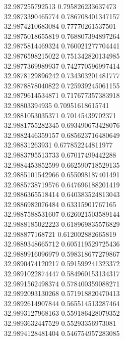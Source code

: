 {32.987255792513	0.795826233637473\\
32.9873390465774	0.786708401347157\\
32.9874210683084	0.77770261537501\\
32.9875018655819	0.768807394897264\\
32.9875814469324	0.760021277704441\\
32.9876598215022	0.751342820134985\\
32.9877369989937	0.742770596997414\\
32.9878129896242	0.734303201481777\\
32.9878878040822	0.725939245061155\\
32.9879614534871	0.717677357383918\\
32.98803394935	0.70951618615741\\
32.9881053035371	0.70145439702371\\
32.9881755282345	0.693490673428076\\
32.9882446359157	0.685623716480649\\
32.98831263931	0.677852244811977\\
32.9883795513733	0.67017499442288\\
32.9884453852599	0.662590718529135\\
32.9885101542966	0.655098187401491\\
32.9885738719576	0.647696188201419\\
32.9886365518414	0.640383524813043\\
32.9886982076484	0.63315901767165\\
32.9887588531607	0.626021503589144\\
32.9888185022223	0.618969835576829\\
32.988877168721	0.612002882665819\\
32.9889348665712	0.605119529725436\\
32.9889916096979	0.598318677279867\\
32.9890474120217	0.591599241323372\\
32.9891022874447	0.584960153134317\\
32.9891562498374	0.578400359088271\\
32.9892093130268	0.571918820470413\\
32.9892614907844	0.565514513287464\\
32.9893127968163	0.559186428079352\\
32.9893632447529	0.55293356973081\\
32.9894128481404	0.546754957283085\\
}
